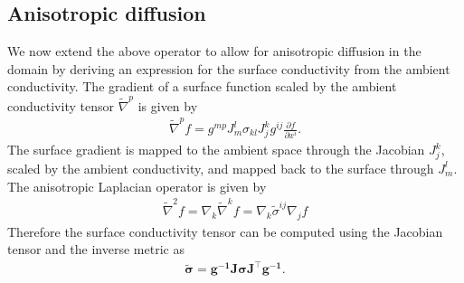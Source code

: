 \subsection{Anisotropic diffusion}
 We now extend the above operator to allow for anisotropic diffusion in the domain by deriving an expression for the surface conductivity from the ambient conductivity. The gradient of a surface function scaled by the ambient conductivity tensor $\tilde{\nabla}^p$ is given by
 \begin{align}
     \tilde{\nabla}^p f = g^{mp} J^l_m \sigma_{kl} J^k_j g^{ij} \frac{\partial f}{\partial x^i}.
 \end{align}
 The surface gradient is mapped to the ambient space through the Jacobian $J^k_j$, scaled by the ambient conductivity, and mapped back to the surface through $J^l_m$. The anisotropic Laplacian operator is given by
 \begin{align}
     \tilde{\nabla}^2 f = \nabla_k \tilde{\nabla}^k f = \nabla_k \tilde{\sigma}^{ij} \nabla_j f
 \end{align}
 Therefore the surface conductivity tensor can be computed using the Jacobian tensor and the inverse metric as
 \begin{align}
     \bm{\tilde{\sigma}} = \bm{g^{-1}J\sigma J^{\top} g^{-1}}.
 \end{align}


